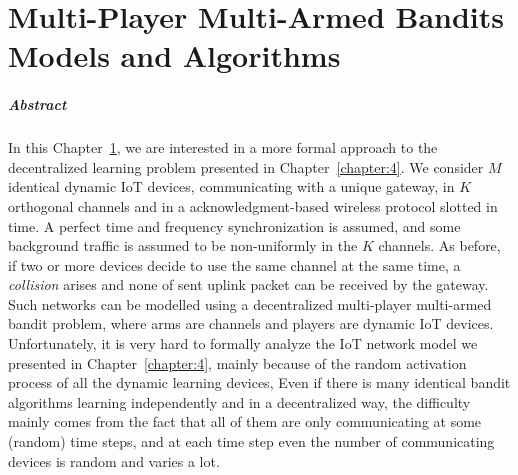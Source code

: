 
\chapter[Multi-Player Multi-Armed Bandits Models]{Multi-Player Multi-Armed Bandits Models and Algorithms}
\label{chapter:5}
\minitoc


\paragraph{Abstract}

In this Chapter~\ref{chapter:5}, we are interested in a more formal approach to the decentralized learning problem presented in Chapter~\ref{chapter:4}.
We consider $M$ identical dynamic IoT devices, communicating with a unique gateway, in $K$ orthogonal channels and in a acknowledgment-based wireless protocol slotted in time.
A perfect time and frequency synchronization is assumed,
and some \iid{} background traffic is assumed to be non-uniformly in the $K$ channels.
As before, if two or more devices decide to use the same channel at the same time, a \emph{collision} arises and none of sent uplink packet can be received by the gateway.
%
Such networks can be modelled using a decentralized multi-player multi-armed bandit problem, where arms are channels and players are dynamic IoT devices.
Unfortunately, it is very hard to formally analyze the IoT network model we presented in Chapter~\ref{chapter:4}, mainly because of the random activation process of all the dynamic learning devices, Even if there is many identical bandit algorithms learning independently and in a decentralized way, the difficulty mainly comes from the fact that all of them are only communicating at some (random) time steps, and at each time step even the number of communicating devices is random and varies a lot.

